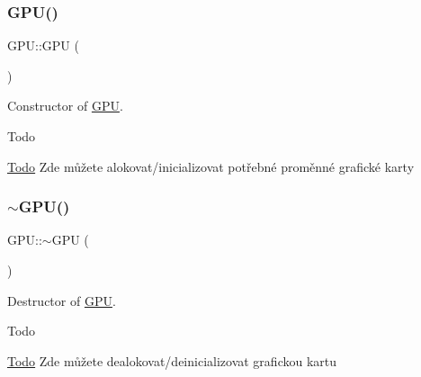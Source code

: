 \subsubsection{\texorpdfstring{G\+P\+U()}{GPU()}}
{\footnotesize\ttfamily G\+P\+U\+::\+G\+PU (\begin{DoxyParamCaption}{ }\end{DoxyParamCaption})}



Constructor of \hyperlink{classGPU}{G\+PU}. 

\begin{DoxyRefDesc}{Todo}
\item[\hyperlink{todo__todo000001}{Todo}]Zde můžete alokovat/inicializovat potřebné proměnné grafické karty \end{DoxyRefDesc}
\mbox{\label{group__gpu__init_gac4d153a08d3b9f40e5a8f1634f4a9e78}} 
\subsubsection{\texorpdfstring{$\sim$\+G\+P\+U()}{~GPU()}}
{\footnotesize\ttfamily G\+P\+U\+::$\sim$\+G\+PU (\begin{DoxyParamCaption}{ }\end{DoxyParamCaption})\hspace{0.3cm}{\ttfamily [virtual]}}



Destructor of \hyperlink{classGPU}{G\+PU}. 

\begin{DoxyRefDesc}{Todo}
\item[\hyperlink{todo__todo000002}{Todo}]Zde můžete dealokovat/deinicializovat grafickou kartu \end{DoxyRefDesc}
